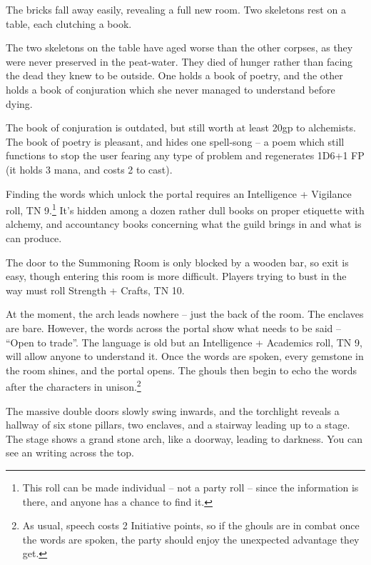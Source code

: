 \begin{multicols}{2}
\begin{boxtext}

  The bricks fall away easily, revealing a full new room.  Two skeletons rest on a table, each clutching a book.

\end{boxtext}

The two skeletons on the table have aged worse than the other corpses, as they were never preserved in the peat-water.
They died of hunger rather than facing the dead they knew to be outside.
One holds a book of poetry, and the other holds a book of conjuration which she never managed to understand before dying.

The book of conjuration is outdated, but still worth at least 20gp to \gls{alchemists}.
The book of poetry is pleasant, and hides one spell-song -- a poem which still functions to stop the user fearing any type of problem and regenerates 1D6+1 FP (it holds 3 mana, and costs 2 to cast).

Finding the words which unlock the portal requires an Intelligence + Vigilance roll, TN 9.\footnote{This roll can be made individual -- not a party roll -- since the information is there, and anyone has a chance to find it.}
It's hidden among a dozen rather dull books on proper etiquette with alchemy, and accountancy books concerning what the guild brings in and what is can produce.

The door to the Summoning Room is only blocked by a wooden bar, so exit is easy, though entering this room is more difficult.
Players trying to bust in the way must roll Strength + Crafts, TN 10.


At the moment, the arch leads nowhere  -- just the back of the room.  The enclaves are bare.
However, the words across the portal show what needs to be said -- ``Open to trade''.
The language is old but an Intelligence + Academics roll, TN 9, will allow anyone to understand it.
Once the words are spoken, every gemstone in the room shines, and the portal opens.
The ghouls then begin to echo the words after the characters in unison.\footnote{As usual, speech costs 2 Initiative points, so if the ghouls are in combat once the words are spoken, the party should enjoy the unexpected advantage they get.}

\begin{boxtext}

  The massive double doors slowly swing inwards, and the torchlight reveals a hallway of six stone pillars, two enclaves, and a stairway leading up to a stage.  The stage shows a grand stone arch, like a doorway, leading to darkness.
  You can see an writing across the top.


\end{boxtext}
\end{multicols}

